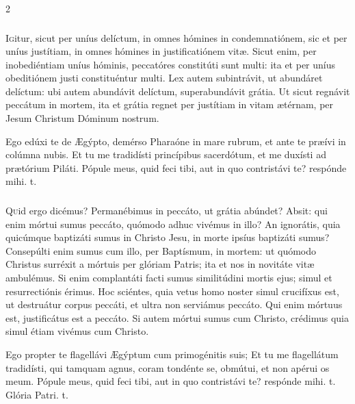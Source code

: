 \documentclass[9pt,twoside]{extarticle}
\begin{document}
\begin{multicols}{2}
\subsubsection*{\center{}}
\lettrine{I}gitur, sicut per uníus delíctum, in omnes hómines in condemnatiónem, sic et per uníus justítiam, in omnes hómines in justificatiónem vitæ. Sicut enim, per inobediéntiam uníus hóminis, peccatóres constitúti sunt multi: ita et per uníus obeditiónem justi constituéntur multi. Lex autem subintrávit, ut abundáret delíctum: ubi autem abundávit delíctum, superabundávit grátia. Ut sicut regnávit peccátum in mortem, ita et grátia regnet per justítiam in vitam ætérnam, per Jesum Christum Dóminum nostrum.

\begin{tightlist}{}
\item {} Ego edúxi te de Ægýpto, demérso Pharaóne in mare rubrum, et ante te præívi in colúmna nubis. \textred{*} Et tu me tradidísti princípibus sacerdótum, et me duxísti ad prætórium Piláti.  Pópule meus, quid feci tibi, aut in quo contristávi te? respónde mihi. t.
\end{tightlist}

\subsubsection*{\center{}}
\lettrine{Q}uid ergo dicémus? Permanébimus in peccáto, ut grátia abúndet? Absit: qui enim mórtui sumus peccáto, quómodo adhuc vivémus in illo? An ignorátis, quia quicúmque baptizáti sumus in Christo Jesu, in morte ipsíus baptizáti sumus? Consepúlti enim sumus cum illo, per Baptísmum, in mortem: ut quómodo Christus surréxit a mórtuis per glóriam Patris; ita et nos in novitáte vitæ ambulémus. Si enim complantáti facti sumus similitúdini mortis ejus; simul et resurrectiónis érimus. Hoc sciéntes, quia vetus homo noster simul crucifíxus est, ut destruátur corpus peccáti, et ultra non serviámus peccáto. Qui enim mórtuus est, justificátus est a peccáto. Si autem mórtui sumus cum Christo, crédimus quia simul étiam vivémus cum Christo.

\begin{tightlist}{}
\item {} Ego propter te flagellávi Ægýptum cum primogénitis suis; \textred{*} Et tu me flagellátum tradidísti, qui tamquam agnus, coram tondénte se, obmútui, et non apérui os meum.  Pópule meus, quid feci tibi, aut in quo contristávi te? respónde mihi. t. Glória Patri. t.
\end{tightlist}


\end{multicols}
\end{document}
